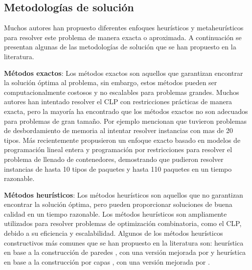 \subsection{Metodologías de solución}

Muchos autores han propuesto diferentes enfoques heurísticos y metaheurísticos para resolver este problema de manera exacta o aproximada. A continuación se presentan algunas de las metodologías de solución que se han propuesto en la literatura.

\textbf{Métodos exactos}: Los métodos exactos son aquellos que garantizan encontrar la solución óptima al problema, sin embargo, estos métodos pueden ser computacionalmente costosos y no escalables para problemas grandes. Muchos autores han intentado resolver el CLP con restricciones prácticas de manera exacta, pero la mayoría ha encontrado que los métodos exactos no son adecuados para problemas de gran tamaño. Por ejemplo \textcite{JUNQUEIRA201274} mencionan que tuvieron problemas de desbordamiento de memoria al intentar resolver instancias con mas de 20 tipos. Más recientemente \textcite{NASCIMENTO2021105186} propusieron un enfoque exacto basado en modelos de programación lineal entera y programación por restricciones para resolver el problema de llenado de contenedores, demostrando que pudieron resolver instancias de hasta 10 tipos de paquetes y hasta 110 paquetes en un tiempo razonable.

\textbf{Métodos heurísticos}: Los métodos heurísticos son aquellos que no garantizan encontrar la solución óptima, pero pueden proporcionar soluciones de buena calidad en un tiempo razonable. Los métodos heurísticos son ampliamente utilizados para resolver problemas de optimización combinatoria, como el CLP, debido a su eficiencia y escalabilidad. Algunos de los métodos heurísticos constructivos más comunes que se han propuesto en la literatura son: heurística en base a la construcción de paredes \parencite{GEORGE1980147}, con una versión mejorada por \textcite{PISINGER2002382} y heurística en base a la construcción por capas \parencite{BISCHOFF1995377}, con una versión mejorada por \textcite{RANCKJUNIOR2019471}.

